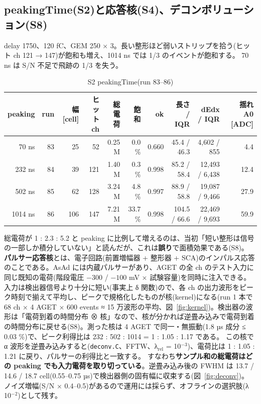 \documentclass[a4paper,11pt]{ltjsarticle}
\begin{document}
\subsection{peakingTime(S2)と応答核(S4)、デコンボリューション(S8)}
delay 1750、120 fC、GEM 250 × 3。長い整形ほど弱いストリップを拾う(ヒット ch 121 → 147)が飽和も増え、1014 ns では 1/3 のイベントが飽和する。
70 ns は S/N 不足で飛跡の 1/3 を失う。

\begin{table}[h]\centering\small
\caption{S2 peakingTime(run 83--86)}
\begin{tabular}{rrrrrrrrrr}
\toprule
peaking & run & 幅 [cell] & ヒット ch & 総電荷 & 飽和 & ok & 長さ / IQR & dEdx / IQR & 揺れ A0 [ADC] \\
\midrule
70 ns & 83 & 25 & 52 & 0.25 M & 0.0 \% & 0.660 & 45.4 / 46.3 & 4,602 / 855 & 4.4 \\
232 ns & 84 & 39 & 121 & 1.40 M & 0.3 \% & 0.998 & 85.2 / 58.4 & 12,493 / 6,438 & 12.4 \\
502 ns & 85 & 62 & 128 & 3.24 M & 4.8 \% & 0.997 & 88.9 / 58.8 & 19,087 / 9,466 & 27.9 \\
1014 ns & 86 & 106 & 147 & 7.21 M & 33.7 \% & 0.998 & 104.5 / 66.6 & 22,469 / 9,693 & 59.9 \\
\bottomrule
\end{tabular}
\end{table}

総電荷が 1 : 2.3 : 5.2 と peaking に比例して増えるのは、当初「短い整形は信号の一部しか積分していない」と読んだが、これは\textbf{誤り}で面積効果である(S8)。
\textbf{パルサー応答核}とは、電子回路(前置増幅器 + 整形器 + SCA)のインパルス応答のことである。AsAd には内蔵パルサーがあり、AGET の全 ch のテスト入力に同じ既知の電荷(階段電圧 $-300$ / $-100$ mV × 試験容量)を同時に注入できる。入力は検出器信号より十分に短い(事実上 δ 関数)ので、各 ch の出力波形をピーク時刻で揃えて平均し、ピークで規格化したものが核(kernel)になる(run 1 本で 68 ch × 4 AGET × 600 events ≈ 15 万波形の平均、図~\ref{fig:kernel})。検出器の波形は「電荷到着の時間分布 ⊗ 核」なので、核が分かれば逆畳み込みで電荷到着の時間分布に戻せる(S8)。測った核は 4 AGET で同一・無振動(1.8 µs 成分 ≤ 0.03 \%)で、ピーク利得比は 232 : 502 : 1014 = 1 : 1.05 : 1.17 である。
この核で α 波形を逆畳み込みすると(\texttt{deconv.C}、FFTW、λ$_\mathrm{rel}$ = 10$^{-3}$)、電荷比は 1 : 1.05 : 1.21 に戻り、パルサーの利得比と一致する。
すなわち\textbf{サンプル和の総電荷はどの peaking でも入力電荷を取り切っている}。逆畳み込み後の FWHM は 13.7 / 14.6 / 18.7 cell(0.55--0.75 µs)で検出器側の固有幅に収束する(図~\ref{fig:deconv})。
ノイズ増幅(S/N × 0.4--0.5)があるので運用には採らず、オフラインの選択肢(λ 10$^{-2}$)として残す。
\end{document}

